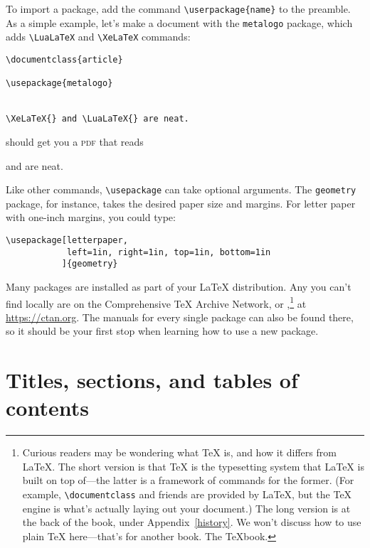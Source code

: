 To import a package, add the command \verb|\userpackage{name}|
to the preamble.
As a simple example, let's make a document with the \texttt{metalogo}
package, which adds \verb|\LuaLaTeX| and \verb|\XeLaTeX| commands:
\begin{leftfigure}
\begin{lstlisting}
\documentclass{article}

\usepackage{metalogo}


\XeLaTeX{} and \LuaLaTeX{} are neat.

\end{lstlisting}
\end{leftfigure}
\begin{samepage}
should get you a \textsc{pdf} that reads
\begin{leftfigure}
\lm \XeLaTeX{} and \LuaLaTeX{} are neat.
\end{leftfigure}
\end{samepage}
Like other commands, \verb|\usepackage| can take optional arguments.
The \texttt{geometry} package, for instance,
takes the desired paper size and margins.
For  letter paper with one-inch margins, you could type:
\begin{leftfigure}
\begin{lstlisting}
\usepackage[letterpaper,
            left=1in, right=1in, top=1in, bottom=1in
           ]{geometry}
\end{lstlisting}
\end{leftfigure}


Many packages are installed as part of your \LaTeX{} distribution.
Any you can't find locally are on the Comprehensive \TeX{}
Archive Network, or ,\punckern\footnote{Curious readers may
be wondering what \TeX{} is, and how it differs from \LaTeX.
The short version is that \TeX{} is the typesetting system that \LaTeX{}
is built on top of---the latter is a framework of commands for the former.
(For example, \texttt{\textbackslash documentclass} and friends are provided by
\LaTeX{}, but the \TeX{} engine is what's actually laying out your document.)
The long version is at the back of the book, under Appendix~\ref{history}.
We won't discuss how to use plain \TeX{} here---that's for another book.
The \TeX book.}
at \url{https://ctan.org}.
The manuals for every single package can also be found there,
so it should be your first stop when learning how to use a new package.

\section{Titles, sections, and tables of contents}

